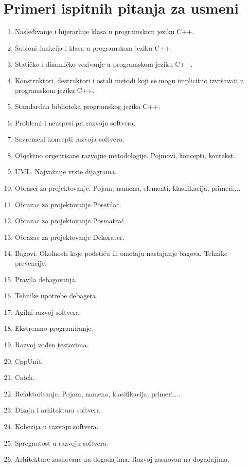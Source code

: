 \documentclass[a4paper]{article}
\begin{document}
\section{Primeri ispitnih pitanja za usmeni}
\begin{enumerate}
 	\item Nasleđivanje i hijerarhije klasa u programskom jeziku C++.
	\item Šabloni funkcija i klasa u programskom jeziku C++.
	\item Statičko i dinamičko vezivanje u programskom jeziku C++.
	\item Konstruktori, destruktori i ostali metodi koji se mogu implicitno izvršavati u programskom jeziku C++.
	\item Standardna biblioteka programskog jezika C++.
	\item Problemi i neuspesi pri razvoju softvera.
	\item Savremeni koncepti razvoja softvera.
	\item Objektno orijentisane razvojne metodologije. Pojmovi, koncepti, kontekst.
	\item UML. Najvažnije vrste dijagrama.
	\item Obrasci za projektovanje. Pojam, namena, elementi, klasifikacija, primeri,...
	\item Obrazac za projektovanje Posetilac.
	\item Obrazac za projektovanje Posmatrač.
	\item Obrazac za projektovanje Dekorater.
	\item Bagovi. Okolnosti koje podstiču ili ometaju nastajanje bagova. Tehnike prevencije.
	\item Pravila debagovanja.
	\item Tehnike upotrebe debagera.
	\item Agilni razvoj softvera.
	\item Ekstremno programiranje.
	\item Razvoj vođen testovima.
	\item CppUnit.
	\item Catch.
	\item Refaktorisanje. Pojam, namena, klasifikacija, primeri,...
	\item Dizajn i arhitektura softvera.
	\item Kohezija u razvoju softvera.
	\item Spregnutost u razvoju softvera.
	\item Arhitekture zasnovane na događajima. Razvoj zasnovan na događajima.

\end{enumerate}
\end{document}
